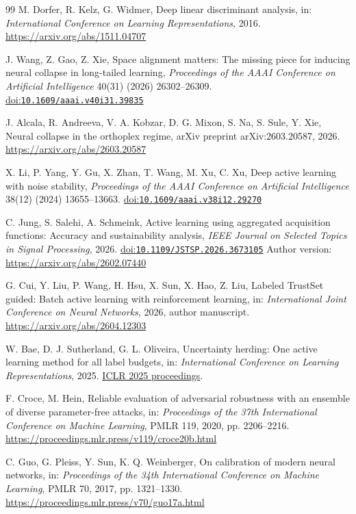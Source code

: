 \documentclass[a4paper,fleqn]{cas-dc}
\providecommand{\doi}[1]{%
  \href{https://doi.org/#1}{doi:\nolinkurl{#1}}}
\begin{document}
\begin{thebibliography}{99}
M. Dorfer, R. Kelz, G. Widmer,
Deep linear discriminant analysis,
in: \emph{International Conference on Learning Representations}, 2016.
\url{https://arxiv.org/abs/1511.04707}


J. Wang, Z. Gao, Z. Xie,
Space alignment matters: The missing piece for inducing
neural collapse in long-tailed learning,
\emph{Proceedings of the AAAI Conference on Artificial Intelligence}
40(31) (2026) 26302--26309.
\doi{10.1609/aaai.v40i31.39835}


J. Alcala, R. Andreeva, V. A. Kobzar, D. G. Mixon,
S. Na, S. Sule, Y. Xie,
Neural collapse in the orthoplex regime,
arXiv preprint arXiv:2603.20587, 2026.
\url{https://arxiv.org/abs/2603.20587}


X. Li, P. Yang, Y. Gu, X. Zhan, T. Wang, M. Xu, C. Xu,
Deep active learning with noise stability,
\emph{Proceedings of the AAAI Conference on Artificial Intelligence}
38(12) (2024) 13655--13663.
\doi{10.1609/aaai.v38i12.29270}


C. Jung, S. Salehi, A. Schmeink,
Active learning using aggregated acquisition functions:
Accuracy and sustainability analysis,
\emph{IEEE Journal on Selected Topics in Signal Processing}, 2026.
\doi{10.1109/JSTSP.2026.3673105}
Author version: \url{https://arxiv.org/abs/2602.07440}


G. Cui, Y. Liu, P. Wang, H. Hsu, X. Sun, X. Hao, Z. Liu,
Labeled TrustSet guided: Batch active learning with reinforcement learning,
in: \emph{International Joint Conference on Neural Networks}, 2026,
author manuscript.
\url{https://arxiv.org/abs/2604.12303}


W. Bae, D. J. Sutherland, G. L. Oliveira,
Uncertainty herding: One active learning method for all label budgets,
in: \emph{International Conference on Learning Representations}, 2025.
\href{https://proceedings.iclr.cc/paper_files/paper/2025/hash/0302fb83c62991efbccf0a003e4f5a92-Abstract-Conference.html}
{ICLR 2025 proceedings}.


F. Croce, M. Hein,
Reliable evaluation of adversarial robustness with an ensemble
of diverse parameter-free attacks,
in: \emph{Proceedings of the 37th International Conference
on Machine Learning}, PMLR 119, 2020, pp. 2206--2216.
\url{https://proceedings.mlr.press/v119/croce20b.html}


C. Guo, G. Pleiss, Y. Sun, K. Q. Weinberger,
On calibration of modern neural networks,
in: \emph{Proceedings of the 34th International Conference
on Machine Learning}, PMLR 70, 2017, pp. 1321--1330.
\url{https://proceedings.mlr.press/v70/guo17a.html}



\end{thebibliography}
\end{document}
